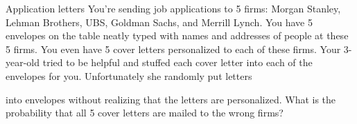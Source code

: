 \begin{problem}{Application letters}
You're sending job applications to 5 firms: Morgan Stanley, Lehman Brothers, UBS,
Goldman Sachs, and Merrill Lynch. You have 5 envelopes on the table neatly typed with
names and addresses of people at these 5 firms. You even have 5 cover letters personalized
to each of these firms. Your 3-year-old tried to be helpful and stuffed each cover letter into
each of the envelopes for you. Unfortunately she randomly put letters


into envelopes without realizing that the letters are personalized. What is the probability
that all 5 cover letters are mailed to the wrong firms?\footnotemark[9]
\end{problem}

